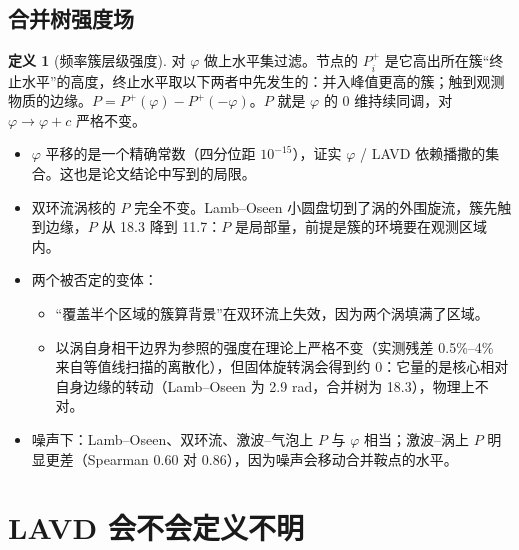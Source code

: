 \documentclass[10.5pt,a4paper]{article}
\theoremstyle{definition}
\newtheorem{definition}{定义}[section]
\theoremstyle{plain}
\theoremstyle{remark}
\begin{document}
\subsection{合并树强度场}
\begin{definition}[频率簇层级强度]
对 $\varphi$ 做上水平集过滤。节点的 $P^+_i$ 是它高出所在簇“终止水平”的高度，终止水平取以下两者中先发生的：并入峰值更高的簇；触到观测物质的边缘。$P=P^+(\varphi)-P^+(-\varphi)$。$P$ 就是 $\varphi$ 的 0 维持续同调，对 $\varphi\to\varphi+c$ 严格不变。
\end{definition}
\begin{table}[H]\centering\small\caption{合并树强度场与参照（同一定义作用于参照 $\varphi$）的一致性。噪声下 $P$ 用 8 次平滑。}\resizebox{\linewidth}{!}{}\end{table}
\begin{table}[H]\centering\small\caption{去掉部分示踪点（Lamb–Oseen 只保留 $r_0<4.5$，双环流只保留 $x_0<1.85$）。}\resizebox{\linewidth}{!}{}\end{table}
\begin{itemize}
\item $\varphi$ 平移的是一个精确常数（四分位距 $10^{-15}$），证实 $\varphi$ / LAVD 依赖播撒的集合。这也是论文结论中写到的局限。
\item 双环流涡核的 $P$ 完全不变。Lamb–Oseen 小圆盘切到了涡的外围旋流，簇先触到边缘，$P$ 从 18.3 降到 11.7：$P$ 是局部量，前提是簇的环境要在观测区域内。
\item 两个被否定的变体：
  \begin{itemize}[leftmargin=1.2em]
  \item “覆盖半个区域的簇算背景”在双环流上失效，因为两个涡填满了区域。
  \item 以涡自身相干边界为参照的强度在理论上严格不变（实测残差 0.5\%–4\% 来自等值线扫描的离散化），但固体旋转涡会得到约 0：它量的是核心相对自身边缘的转动（Lamb–Oseen 为 2.9 rad，合并树为 18.3），物理上不对。
  \end{itemize}
\item 噪声下：Lamb–Oseen、双环流、激波–气泡上 $P$ 与 $\varphi$ 相当；激波–涡上 $P$ 明显更差（Spearman 0.60 对 0.86），因为噪声会移动合并鞍点的水平。
\end{itemize}

\section{LAVD 会不会定义不明}
\end{document}
